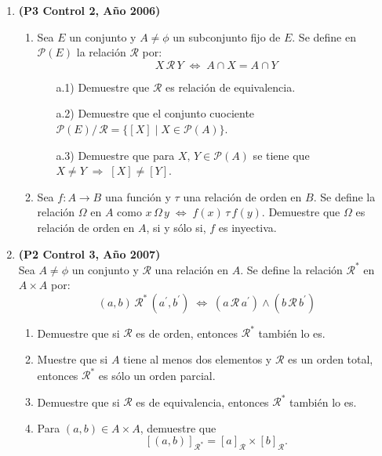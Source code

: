 \documentclass[10pt]{article}
\newcommand{\pr}[1]{\cur{P}(#1)}
\theoremstyle{plain}
\newcommand{\cur}[1]{\mathcal{#1}}
\theoremstyle{definition}
\begin{document}
\begin{enumerate}[label=\textbf{P\arabic*.-}]
\item \textbf{(P3 Control 2, Año 2006)}
\begin{enumerate}
\item Sea $E$ un conjunto y $A\neq \phi$ un subconjunto fijo de $E$. Se define en $\pr{E}$ la relación $\cur{R}$ por:
$$ X\,\cur{R}\,Y \; \Longleftrightarrow \; A\cap X=A\cap Y$$
\begin{enumerate}
\item[a.1)] Demuestre que $\cur{R}$ es relación de equivalencia.
\item[a.2)] Demuestre que el conjunto cuociente $\pr{E}/\,\cur{R}=\{[X]\;|\;X\in\pr{A}\}$.
\item[a.3)] Demuestre que para $X,\,Y \in \pr{A}$ se tiene que $X\neq Y \; \Rightarrow \; \left[X\right] \neq \left[Y\right].$
\end{enumerate}
\item Sea $f:A\longrightarrow B$ una función y $\tau$ una relación de orden en $B$. Se define la relación $\Omega$ en $A$ como $x\,\Omega \, y \; \Leftrightarrow \; f(x)\,\tau \, f(y)$. Demuestre que $\Omega$ es relación de orden en $A$, si y sólo si, $f$ es inyectiva.
\end{enumerate}
\item \textbf{(P2 Control 3, Año 2007)}\\
Sea $A\neq \phi$ un conjunto y $\cur{R}$ una relación en $A$. Se define la relación $\cur{R}^{\ast}$ en $A\times A$ por:
$$(a,b)\,\cur{R}^{*}\,(a^{\prime},b^{\prime}) \; \Leftrightarrow \; (a \, \cur{R}\, a^{\prime}) \wedge (b \, \cur{R} \, b^{\prime})$$
\begin{enumerate}
\item Demuestre que si $\cur{R}$ es de orden, entonces $\cur{R}^*$ también lo es.
\item Muestre que si $A$ tiene al menos dos elementos y $\cur{R}$ es un orden total, entonces $\cur{R}^*$ es sólo un orden parcial.
\item Demuestre que si $\cur{R}$ es de equivalencia, entonces $\cur{R}^*$ también lo es.
\item Para $(a,b)\in A\times A$, demuestre que
$$[(a,b)]_{\cur{R}^*}=[a]_{\cur{R}}\times [b]_{\cur{R}}.$$
\end{enumerate}


\end{enumerate}
\end{document}
